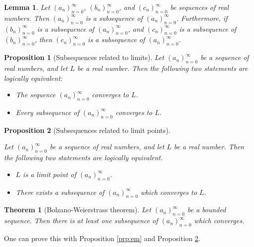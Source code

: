 \documentclass[
]{book}
\providecommand{\tightlist}{%
  \setlength{\itemsep}{0pt}\setlength{\parskip}{0pt}}
\newtheorem{theorem}{Theorem}[chapter]
\newtheorem{lemma}{Lemma}[chapter]
\newtheorem{proposition}{Proposition}[chapter]
\theoremstyle{definition}
\theoremstyle{definition}
\theoremstyle{definition}
\theoremstyle{definition}
\theoremstyle{remark}
\begin{document}
\begin{lemma}
Let \((a_n)_{n=0}^{\infty}\), \((b_n)_{n=0}^{\infty}\), and \((c_n)_{n=0}^{\infty}\) be sequences of real numbers. Then \((a_n)_{n=0}^{\infty}\) is a subsequence of \((a_n)_{n=0}^{\infty}\). Furthermore, if \((b_n)_{n=0}^{\infty}\) is a subsequence of \((a_n)_{n=0}^{\infty}\), and \((c_n)_{n=0}^{\infty}\) is a subsequence of \((b_n)_{n=0}^{\infty}\), then \((c_n)_{n=0}^{\infty}\) is a subsequence of \((a_n)_{n=0}^{\infty}\).
\end{lemma}

\begin{proposition}[Subsequences related to limits]

Let \((a_n)_{n=0}^{\infty}\) be a sequence of real numbers, and let \(L\) be a real number. Then the following two statements are logically equivalent:

\begin{itemize}
\tightlist
\item
  The sequence \((a_n)_{n=0}^{\infty}\) converges to \(L\).
\item
  Every subsequence of \((a_n)_{n=0}^{\infty}\) converges to \(L\).
\end{itemize}

\end{proposition}

\begin{proposition}[Subsequences related to limit points]
\protect\hypertarget{prp:s}{}\label{prp:s}

Let \((a_n)_{n=0}^{\infty}\) be a sequence of real numbers, and let \(L\) be a real number. Then the following two statements are logically equivalent.

\begin{itemize}
\tightlist
\item
  \(L\) is a limit point of \((a_n)_{n=0}^{\infty}\).
\item
  There exists a subsequence of \((a_n)_{n=0}^{\infty}\) which converges to \(L\).
\end{itemize}

\end{proposition}

\begin{theorem}[Bolzano-Weierstrass theorem]
Let \((a_n)_{n=0}^{\infty}\) be a bounded sequence. Then there is at least one subsequence of \((a_n)_{n=0}^{\infty}\) which converges.
\end{theorem}

One can prove this with Proposition \ref{prp:em} and Proposition \ref{prp:s}.
\end{document}
